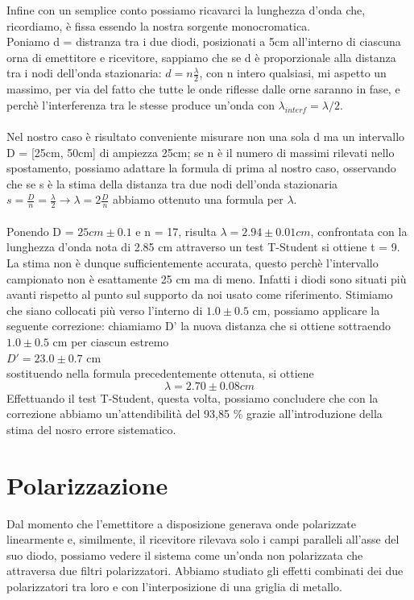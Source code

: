 \documentclass{article}
\theoremstyle{definition}
\begin{document}
\noindent Infine con un semplice conto possiamo ricavarci la lunghezza d'onda che, ricordiamo, è fissa essendo la nostra sorgente monocromatica.\\
Poniamo d = distranza tra i due diodi, posizionati a 5cm all'interno di ciascuna orna di emettitore e ricevitore, sappiamo che se d è proporzionale alla distanza tra i nodi dell'onda stazionaria:  \(d = n\frac{\lambda}{2}\), con n intero qualsiasi, mi aspetto un massimo, per via del fatto che tutte le onde riflesse dalle orne saranno in fase, e perchè l'interferenza tra le stesse produce un'onda con \(\lambda_{interf} = \lambda/2\).\\\\
Nel nostro caso è risultato conveniente misurare non una sola d ma un intervallo D = [25cm, 50cm] di ampiezza 25cm; se n è il numero di massimi rilevati nello spostamento, possiamo adattare la formula di prima al nostro caso, osservando che se s è la stima della distanza tra due nodi dell'onda stazionaria \( s = \frac{D}{n} =  \frac{\lambda}{2} \rightarrow \lambda = 2\frac{D}{n}\) abbiamo ottenuto una formula per \(\lambda\).\\\\
Ponendo D = \(25cm \pm 0.1\) e n = 17, risulta \(\lambda = 2.94 \pm 0.01cm\), confrontata con la lunghezza d'onda nota di 2.85 cm attraverso un test T-Student si ottiene t = 9. La stima non è dunque sufficientemente accurata, questo perchè l'intervallo campionato non è esattamente 25 cm ma di meno. Infatti i diodi sono situati più avanti rispetto al punto sul supporto da noi usato come riferimento. Stimiamo che siano collocati più verso l'interno di \( 1.0 \pm 0.5 \) cm, possiamo applicare la seguente correzione:
 chiamiamo D' la nuova distanza che si ottiene sottraendo \(1.0 \pm 0.5 \) cm per ciascun estremo\\
 \Rightarrow \( D'= 23.0 \pm 0.7 \) cm \\
 sostituendo nella formula precedentemente ottenuta, si ottiene
 \[ \lambda = 2.70 \pm 0.08cm\] 
 Effettuando il test T-Student, questa volta, possiamo concludere che con la correzione abbiamo un'attendibilità del 93,85 \% grazie all'introduzione della stima del nosro errore sistematico.


\section{Polarizzazione} %
Dal momento che l'emettitore a disposizione generava onde polarizzate linearmente e, similmente, il ricevitore rilevava solo i campi paralleli all'asse del suo diodo, possiamo vedere il sistema come un'onda non polarizzata che attraversa due filtri polarizzatori. Abbiamo studiato gli effetti combinati dei due polarizzatori tra loro e con l'interposizione di una griglia di metallo.
\end{document}

